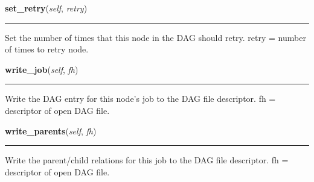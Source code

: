     \label{pipeline:CondorDAGNode:set_retry}
    \vspace{0.5ex}

    \noindent\begin{boxedminipage}{\textwidth}

    \raggedright \textbf{set\_retry}(\textit{self}, \textit{retry})

    \vspace{-1.5ex}

    \rule{\textwidth}{0.5\fboxrule}
    Set the number of times that this node in the DAG should retry. retry 
    = number of times to retry node.

    \vspace{1ex}

    \end{boxedminipage}

    \label{pipeline:CondorDAGNode:write_job}
    \vspace{0.5ex}

    \noindent\begin{boxedminipage}{\textwidth}

    \raggedright \textbf{write\_job}(\textit{self}, \textit{fh})

    \vspace{-1.5ex}

    \rule{\textwidth}{0.5\fboxrule}
    Write the DAG entry for this node's job to the DAG file descriptor. 
    fh = descriptor of open DAG file.

    \vspace{1ex}

    \end{boxedminipage}

    \label{pipeline:CondorDAGNode:write_parents}
    \vspace{0.5ex}

    \noindent\begin{boxedminipage}{\textwidth}

    \raggedright \textbf{write\_parents}(\textit{self}, \textit{fh})

    \vspace{-1.5ex}

    \rule{\textwidth}{0.5\fboxrule}
    Write the parent/child relations for this job to the DAG file 
    descriptor. fh = descriptor of open DAG file.

    \vspace{1ex}

    \end{boxedminipage}

